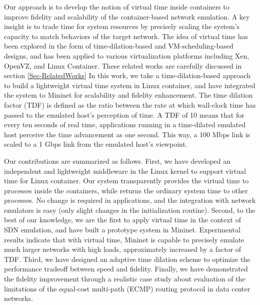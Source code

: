 Our approach is to develop the notion of virtual time inside containers to improve fidelity and scalability of the container-based network emulation. 
A key insight is to trade time for system resources by precisely scaling the system's capacity to match behaviors of the target network. 
The idea of virtual time has been explored in the form of time-dilation-based\cite{ToInfinityBeyond} and VM-scheduling-based\cite{VirtTimeOpenVZ, SliceTime}  designs, and has been applied to various virtualization platforms including Xen\cite{DieCast}, OpenVZ\cite{VirtTimeOpenVZ}, and Linux Container\cite{TimeKeeper}. These related works are carefully discussed in section \ref{Sec-RelatedWorks}
In this work, we take a time-dilation-based approach to build a lightweight virtual time system in Linux container, and have integrated the system to Mininet for scalability and fidelity enhancement. 
The time dilation factor (TDF) is defined as the ratio between the rate at which wall-clock time has passed to the emulated host's perception of time\cite{ToInfinityBeyond}. 
A TDF of 10 means that for every ten seconds of real time, applications running in a time-dilated emulated host perceive the time advancement as one second. This way, a 100 Mbps link is scaled to a 1 Gbps link from the emulated host's viewpoint.

Our contributions are summarized as follows. 
First, we have developed an independent and lightweight middleware in the Linux kernel to support virtual time for Linux container. 
Our system transparently provides the virtual time to processes inside the containers, while returns the ordinary system time to other processes. %
No change is required in applications, and the integration with network emulators is easy (only slight changes in the initialization routine). 
Second, to the best of our knowledge, we are the first to apply virtual time in the context of SDN emulation, and have built a prototype system in Mininet. 
Experimental results indicate that with virtual time, Mininet is capable to precisely emulate much larger networks with high loads, approximately increased by a factor of TDF. 
Third, we have designed an adaptive time dilation scheme to optimize the performance tradeoff between speed and fidelity. 
Finally, we have demonstrated the fidelity improvement through a realistic case study about evaluation of the limitations of the equal-cost multi-path (ECMP) routing protocol in data center networks.

